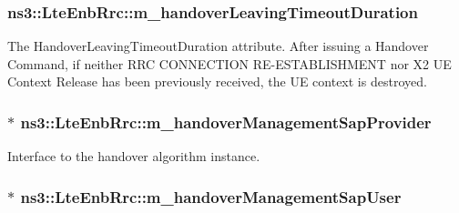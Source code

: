 \subsubsection[{\texorpdfstring{m\+\_\+handover\+Leaving\+Timeout\+Duration}{m_handoverLeavingTimeoutDuration}}]{ ns3\+::\+Lte\+Enb\+Rrc\+::m\+\_\+handover\+Leaving\+Timeout\+Duration\hspace{0.3cm}{\ttfamily [private]}}\hypertarget{classns3_1_1LteEnbRrc_acf57f59c97e8e1207d8eea66590fbc27}{}\label{classns3_1_1LteEnbRrc_acf57f59c97e8e1207d8eea66590fbc27}
The {\ttfamily Handover\+Leaving\+Timeout\+Duration} attribute. After issuing a Handover Command, if neither R\+RC C\+O\+N\+N\+E\+C\+T\+I\+ON R\+E-\/\+E\+S\+T\+A\+B\+L\+I\+S\+H\+M\+E\+NT nor X2 UE Context Release has been previously received, the UE context is destroyed. 
\subsubsection[{\texorpdfstring{m\+\_\+handover\+Management\+Sap\+Provider}{m_handoverManagementSapProvider}}]{$\ast$ ns3\+::\+Lte\+Enb\+Rrc\+::m\+\_\+handover\+Management\+Sap\+Provider\hspace{0.3cm}{\ttfamily [private]}}\hypertarget{classns3_1_1LteEnbRrc_a75cf74c56639713340fa9ae514dcf6d3}{}\label{classns3_1_1LteEnbRrc_a75cf74c56639713340fa9ae514dcf6d3}


Interface to the handover algorithm instance. 

\subsubsection[{\texorpdfstring{m\+\_\+handover\+Management\+Sap\+User}{m_handoverManagementSapUser}}]{$\ast$ ns3\+::\+Lte\+Enb\+Rrc\+::m\+\_\+handover\+Management\+Sap\+User\hspace{0.3cm}{\ttfamily [private]}}\hypertarget{classns3_1_1LteEnbRrc_a40201970adca4d2986f20dbd66aea33a}{}\label{classns3_1_1LteEnbRrc_a40201970adca4d2986f20dbd66aea33a}


